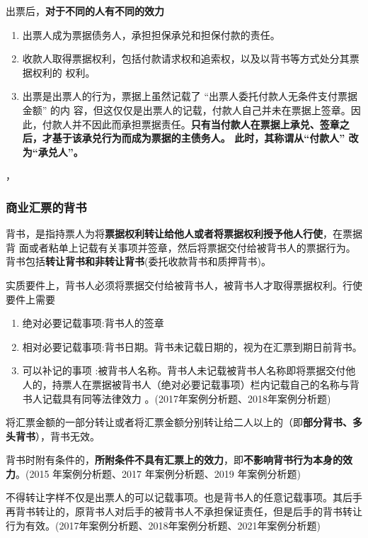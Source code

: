 \documentclass[UTF8,12pt]{ctexart}
\numberwithin{equation}{section} %
\numberwithin{figure}{section}
\numberwithin{table}{section}
\begin{document}
	出票后，\textbf{对于不同的人有不同的效力}
	\begin{enumerate}
		\item 出票人成为票据债务人，承担担保承兑和担保付款的责任。
		
		\item 收款人取得票据权利，包括付款请求权和追索权，以及以背书等方式处分其票据权利的 权利。
		
		\item 出票是出票人的行为，票据上虽然记载了 “出票人委托付款人无条件支付票据金额” 的内 容，但这仅仅是出票人的记载，付款人自己并未在票据上签章。因此，付款人并不因此而承担票据责任。\textbf{只有当付款人在票据上承兑、签章之后，才基于该承兑行为而成为票据的主债务人。 此时，其称谓从“付款人” 改为“承兑人”。}
	\end{enumerate}，

	
	
	
	\subsubsection{商业汇票的背书} 
	背书，是指持票人为将\textbf{票据权利转让给他人或者将票据权利授予他人行使}，在票据背 面或者粘单上记载有关事项并签章，然后将票据交付给被背书人的票据行为。背书包括\textbf{转让背书和非转让背书}(委托收款背书和质押背书)。
	
	实质要件上，背书人必须将票据交付给被背书人，被背书人才取得票据权利。行使要件上需要
	\begin{enumerate}
		\item 绝对必要记载事项:背书人的签章
		
		\item 相对必要记载事项:背书日期。背书未记载日期的，视为在汇票到期日前背书。
		
		\item 可以补记的事项 :被背书人名称。背书人未记载被背书人名称即将票据交付他人的，持票人在票据被背书人（绝对必要记载事项）栏内记载自己的名称与背书人记载具有同等法律效力 。(2017年案例分析题、2018年案例分析题)
	\end{enumerate}

	将汇票金额的一部分转让或者将汇票金额分别转让给二人以上的（即\textbf{部分背书、多头背书}），背书无效。
	
	背书时附有条件的，\textbf{所附条件不具有汇票上的效力}，即\textbf{不影响背书行为本身的效力}。(2015 年案例分析题、2017 年案例分析题、2019 年案例分析题)
	
	不得转让字样不仅是出票人的可以记载事项。也是背书人的任意记载事项。其后手再背书转让的，原背书人对后手的被背书人不承担保证责任，但是后手的背书转让行为有效。(2017年案例分析题、2018年案例分析题、2021年案例分析题)
	
\end{document}

